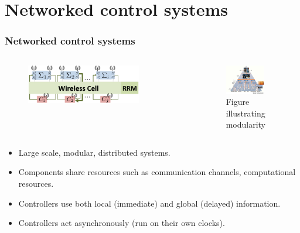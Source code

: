 \documentclass{beamer}
\begin{document}
\section{Networked control systems}
\begin{frame}
 \frametitle{Networked control systems}
\begin{columns}
\begin{column}{0.5\textwidth}
\begin{figure}
\centering
\includegraphics[width=0.8\textwidth]{CSRM.pdf}
\label{fig1}
\end{figure}
\end{column}
\begin{column}{0.5\textwidth}  %
\begin{figure}
\centering
\includegraphics[width=0.75\textwidth]{ncs3}
\caption{{\footnotesize Figure illustrating modularity}} 
\label{fig3}
\end{figure}
\end{column}
\end{columns}
\begin{itemize}
 \item Large scale, modular, distributed systems.
 \item Components share resources such as communication channels, computational resources.
 \item Controllers use both local (immediate) and global (delayed) information.
 \item Controllers act asynchronously {\color{blue}(run on their own clocks)}.
\end{itemize}
\end{frame}
\end{document}
